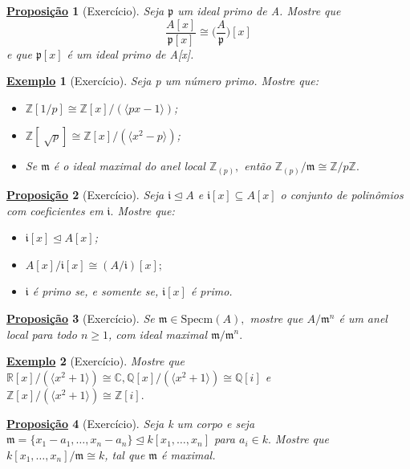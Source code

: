 \documentclass{article}
\newtheorem*{prop*}{\underline{Proposi\c c\~ao}}
\newtheorem{example}{\underline{Exemplo}}
\begin{document}
\begin{prop*}[Exercício]
  Seja \(\mathfrak{p}\) um ideal primo de A. Mostre que 
  \[
    \frac{A[x]}{\mathfrak{p}[x]}\cong{\biggl(\frac{A}{\mathfrak{p}}\biggr)}[x]
  \]  
  e que \(\mathfrak{p}[x]\) é um ideal primo de A[x].
\end{prop*}
\begin{example}[Exercício]
  Seja p um número primo. Mostre que:
  \begin{itemize}
    \item[1)] \(\mathbb{Z}[1/p]\cong \mathbb{Z}[x]/(\langle px-1 \rangle)\);
    \item[2)] \(\mathbb{Z}[\sqrt[]{p}]\cong \mathbb{Z}[x]/(\langle x^{2}-p \rangle)\);
    \item[3)] Se \(\mathfrak{m}\) é o ideal maximal do anel local \(\mathbb{Z}_{(p)},\) então \(\mathbb{Z}_{(p)}/\mathfrak{m}\cong{\mathbb{Z}/p \mathbb{Z}}.\)
  \end{itemize}
\end{example}
\begin{prop*}[Exercício]
  Seja \(\mathfrak{i}\trianglelefteq{A}\) e \(\mathfrak{i}[x]\subseteq A[x]\) o conjunto de polinômios 
  com coeficientes em \(\mathfrak{i}.\) Mostre que:
  \begin{itemize}
    \item[1)] \(\mathfrak{i}[x] \trianglelefteq{A[x]}\);
    \item[2)] \(A[x]/\mathfrak{i}[x]\cong{(A/\mathfrak{i})}[x];\)
    \item[3)] \(\mathfrak{i}\) é primo se, e somente se, \(\mathfrak{i}[x]\) é primo.
  \end{itemize}
\end{prop*}
\begin{prop*}[Exercício]
  Se \(\mathfrak{m}\in \mathrm{Specm}(A),\) mostre que \(A/\mathfrak{m}^{n}\) é um anel local para todo
  \(n \geq 1\), com ideal maximal \(\mathfrak{m}/\mathfrak{m}^{n}.\)
\end{prop*}
\begin{example}[Exercício]
  Mostre que \(\mathbb{R}[x]/(\langle x^{2}+1 \rangle)\cong{\mathbb{C}}, \mathbb{Q}[x]/(\langle x^{2}+1 \rangle)\cong{\mathbb{Q}[i]}\)
  e \(\mathbb{Z}[x]/(\langle x^{2}+1 \rangle)\cong{\mathbb{Z}[i]}.\)
\end{example}
\begin{prop*}[Exercício]
  Seja k um corpo e seja \(\mathfrak{m} = \{x_{1}-a_{1}, \dotsc, x_{n}-a_{n}\}\trianglelefteq{k[x_{1}, \dotsc, x_{n}]}\) para
  \(a_{i}\in k.\) Mostre que \(k[x_{1}, \dotsc, x_{n}]/\mathfrak{m}\cong{k}\), tal que \(\mathfrak{m}\) é maximal. 
\end{prop*}
\end{document}
